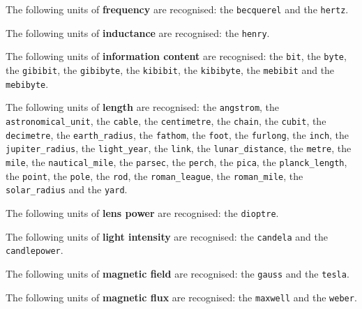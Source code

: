 \noindent The following units of {\bf frequency} are recognised:\newline
\noindent the {\tt becquerel} and the {\tt hertz}.\vspace{5mm}

\noindent The following units of {\bf inductance} are recognised:\newline
\noindent the {\tt henry}.\vspace{5mm}

\noindent The following units of {\bf information content} are recognised:\newline
\noindent the {\tt bit}, the {\tt byte}, the {\tt gibibit}, the {\tt gibibyte}, the {\tt kibibit}, the {\tt kibibyte}, the {\tt mebibit} and the {\tt mebibyte}.\vspace{5mm}

\noindent The following units of {\bf length} are recognised:\newline
\noindent the {\tt angstrom}, the {\tt astronomical\_\-unit}, the {\tt cable}, the {\tt centimetre}, the {\tt chain}, the {\tt cubit}, the {\tt decimetre}, the {\tt earth\_\-radius}, the {\tt fathom}, the {\tt foot}, the {\tt furlong}, the {\tt inch}, the {\tt jupiter\_\-radius}, the {\tt light\_\-year}, the {\tt link}, the {\tt lunar\_\-distance}, the {\tt metre}, the {\tt mile}, the {\tt nautical\_\-mile}, the {\tt parsec}, the {\tt perch}, the {\tt pica}, the {\tt planck\_\-length}, the {\tt point}, the {\tt pole}, the {\tt rod}, the {\tt roman\_\-league}, the {\tt roman\_\-mile}, the {\tt solar\_\-radius} and the {\tt yard}.\vspace{5mm}

\noindent The following units of {\bf lens power} are recognised:\newline
\noindent the {\tt dioptre}.\vspace{5mm}

\noindent The following units of {\bf light intensity} are recognised:\newline
\noindent the {\tt candela} and the {\tt candlepower}.\vspace{5mm}

\noindent The following units of {\bf magnetic field} are recognised:\newline
\noindent the {\tt gauss} and the {\tt tesla}.\vspace{5mm}

\noindent The following units of {\bf magnetic flux} are recognised:\newline
\noindent the {\tt maxwell} and the {\tt weber}.\vspace{5mm}

